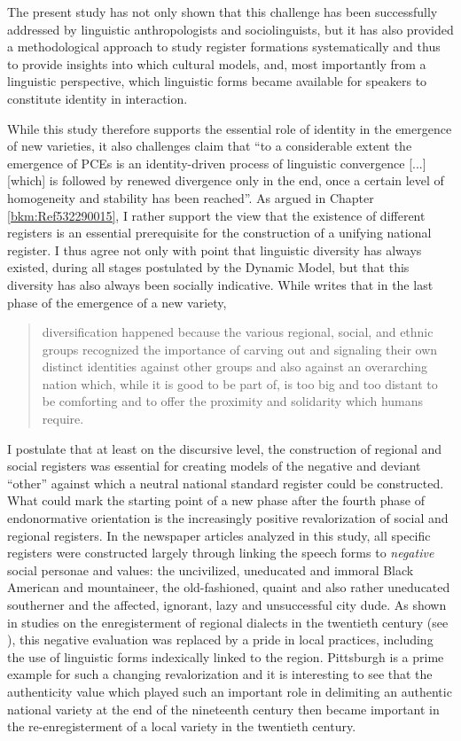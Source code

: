 The present study has not only shown that this challenge has been successfully addressed by linguistic anthropologists and sociolinguists, but it has also provided a methodological approach to study register formations systematically and thus to provide insights into which cultural models, and, most importantly from a linguistic perspective, which linguistic forms became available for speakers to constitute identity in interaction.


While this study therefore supports the essential role of identity in the emergence of new varieties, it also challenges  claim that “to a considerable extent the emergence of PCEs is an identity-driven process of linguistic convergence [...] [which] is followed by renewed divergence only in the end, once a certain level of homogeneity and stability has been reached”. As argued in Chapter \ref{bkm:Ref532290015}, I rather support the view that the existence of different registers is an essential prerequisite for the construction of a unifying national register. I thus agree not only with  point that linguistic diversity has always existed, during all stages postulated by the Dynamic Model, but that this diversity has also always been socially indicative. While \citet[296]{Schneider2007} writes that in the last phase of the emergence of a new variety,

\begin{quote}
diversification happened because the various regional, social, and ethnic groups recognized the importance of carving out and signaling their own distinct identities against other groups and also against an overarching nation which, while it is good to be part of, is too big and too distant to be comforting and to offer the proximity and solidarity which humans require.
\end{quote}

I postulate that at least on the discursive level, the construction of regional and social registers was essential for creating models of the negative and deviant “other” against which a neutral national standard register could be constructed. What could mark the starting point of a new phase after the fourth phase of endonormative orientation is the increasingly positive revalorization of social and regional registers. In the newspaper articles analyzed in this study, all specific registers were constructed largely through linking the speech forms to \emph{negative} social personae and values: the uncivilized, uneducated and immoral Black American and mountaineer, the old-fashioned, quaint and also rather uneducated southerner and the affected, ignorant, lazy and unsuccessful city dude. As shown in studies on the enregisterment of regional dialects in the twentieth century (see ), this negative evaluation was replaced by a pride in local practices, including the use of linguistic forms indexically linked to the region. Pittsburgh is a prime example for such a changing revalorization and it is interesting to see that the authenticity value which played such an important role in delimiting an authentic national variety at the end of the nineteenth century then became important in the re-enregisterment of a local variety in the twentieth century.

